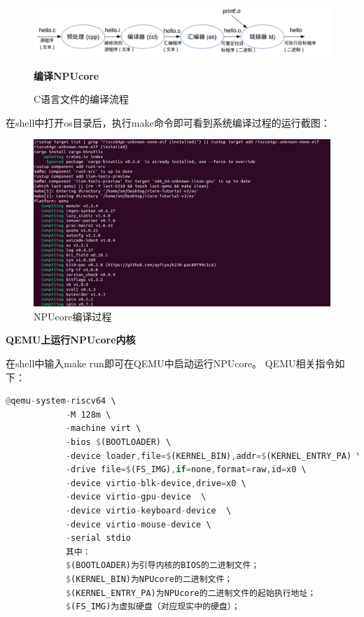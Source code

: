 \begin{figure}[htb]
	\centering
	\includegraphics[width=\textwidth]{figures/02-01-C语言文件的编译流程.png}
	\caption{
		C语言文件的编译流程
	}
	\label{fig:C语言文件的编译流程}
	
	\textbf{编译NPUcore}
\end{figure}
	在shell中打开os目录后，执行make命令即可看到系统编译过程的运行截图：
	\begin{figure}[htb]
		\centering
		\includegraphics[width=\textwidth]{figures/02-01-NPUcore编译过程.png}
		\caption{
			NPUcore编译过程
		}
		\label{fig:NPUcore编译过程}
	\end{figure}
		\textbf{QEMU上运行NPUcore内核}
		
		在shell中输入make run即可在QEMU中启动运行NPUcore。
		QEMU相关指令如下：
		
		\begin{lstlisting}[language={Rust}, label={code:forktest},
			caption={在QEMU中启动运行NPUcore指令}]
			@qemu-system-riscv64 \
			-M 128m \
			-machine virt \
			-bios $(BOOTLOADER) \
			-device loader,file=$(KERNEL_BIN),addr=$(KERNEL_ENTRY_PA) \
			-drive file=$(FS_IMG),if=none,format=raw,id=x0 \
			-device virtio-blk-device,drive=x0 \
			-device virtio-gpu-device  \
			-device virtio-keyboard-device  \
			-device virtio-mouse-device \
			-serial stdio 
			其中：
			$(BOOTLOADER)为引导内核的BIOS的二进制文件；
			$(KERNEL_BIN)为NPUcore的二进制文件；
			$(KERNEL_ENTRY_PA)为NPUcore的二进制文件的起始执行地址；
			$(FS_IMG)为虚拟硬盘（对应现实中的硬盘）；
		\end{lstlisting}
		

